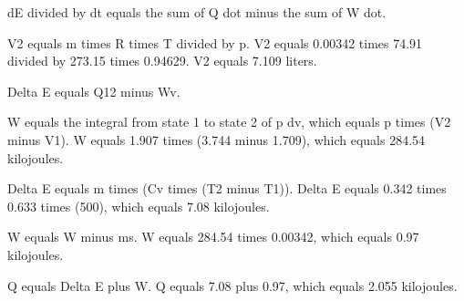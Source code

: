 dE divided by dt equals the sum of Q dot minus the sum of W dot.  

V2 equals m times R times T divided by p.  
V2 equals 0.00342 times 74.91 divided by 273.15 times 0.94629.  
V2 equals 7.109 liters.  

Delta E equals Q12 minus Wv.  

W equals the integral from state 1 to state 2 of p dv, which equals p times (V2 minus V1).  
W equals 1.907 times (3.744 minus 1.709), which equals 284.54 kilojoules.  

Delta E equals m times (Cv times (T2 minus T1)).  
Delta E equals 0.342 times 0.633 times (500), which equals 7.08 kilojoules.  

W equals W minus ms.  
W equals 284.54 times 0.00342, which equals 0.97 kilojoules.  

Q equals Delta E plus W.  
Q equals 7.08 plus 0.97, which equals 2.055 kilojoules.